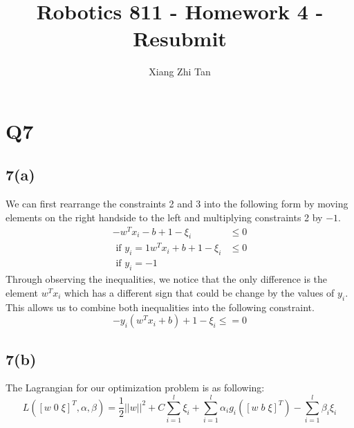 \documentclass{article}
\begin{document}
\title{Robotics 811 - Homework 4 - Resubmit}
\author{Xiang Zhi Tan}
\maketitle

\section{Q7}
\subsection*{7(a)}
We can first rearrange the constraints 2 and 3 into the following form by moving elements on the right handside to the left and multiplying constraints 2 by $-1$.
\begin{equation*}
\begin{aligned}
- w^Tx_i - b + 1 - \xi_i &\leq 0\\ \mbox{ if } y_i = 1
w^Tx_i + b + 1 - \xi_i &\leq 0\\ \mbox{ if } y_i = -1
\end{aligned} 
\end{equation*}
Through observing the inequalities, we notice that the only difference is the element $w^Tx_i$ which has a different sign that could be change by the values of $y_i$. This allows us to combine both inequalities into the following constraint.
\begin{equation*}
- y_i(w^Tx_i + b) + 1 - \xi_i \leq = 0
\end{equation*}

\subsection*{7(b)}
The Lagrangian for our optimization problem is as following:
\begin{equation*}
L ([w\;0\;\xi]^T, \alpha, \beta) = \frac{1}{2}||w||^2 + C \sum_{i=1}^l \xi_i + \sum_{i=1}^l \alpha_ig_i([w\;b\;\xi]^T) - \sum_{i=1}^l \beta_i \xi_i
\end{equation*}
\end{document}
